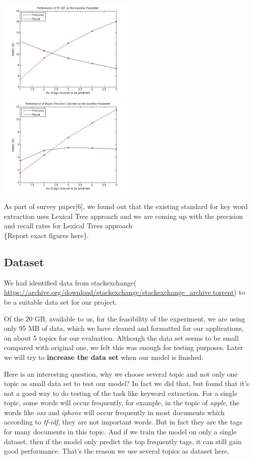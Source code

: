 \documentclass[dvips,12pt]{article}
\begin{document}
		\includegraphics[width=0.5\textwidth]{../baseline/TfIdf.jpg}
		\includegraphics[width=0.5\textwidth]{../baseline/BayesPrecisionClassifier.jpg}
				
		As part of survey paper[6], we found out that the existing standard for key word extraction uses Lexical Tree approach and we are coming up with the precision and recall rates for Lexical Trees approach \\\{Report exact figures here\}.
		
		\subsection{Dataset}
		
		We had identified data from stackexchange( \url{https://archive.org/download/stackexchange/stackexchange_archive.torrent}) to be a suitable data set for our project. 
		
		Of the 20 GB, available to us, for the feasibility of the experiment, we are using only 95 MB of data, which we have cleaned and formatted for our applications, on about 5 topics for our evaluation. Although the data set seems to be small compared with original one, we felt this was enough for testing purposes. Later we will try to \textbf{increase the data set} when our model is finished.
        
        Here is an interesting question, why we choose several topic and not only one topic as small data set to test our model? In fact we did that, but found that it's not a good way to do testing of the task like keyword extraction. For a single topic, some words will occur frequently, for example, in the topic of \emph{apple}, the words like \emph{osx} and \emph{iphone} will occur frequently in most documents which according to \emph{tf-idf}, they are not important words. But in fact they are the tags for many documents in this topic. And if we train the model on only a single dataset, then if the model only predict the top frequently tags, it can still gain good performance. That's the reason we use several topics as dataset here.
        
\end{document}
